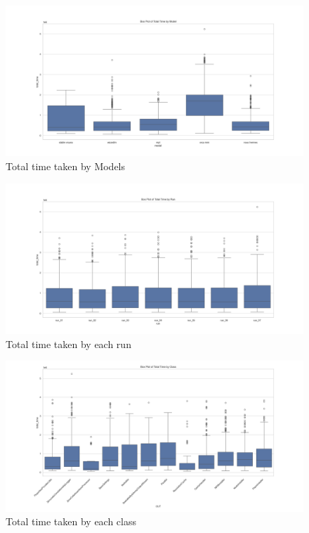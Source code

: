 \begin{figure}[H]
\centering
\includegraphics[width=1\textwidth]{images/time_by_model.png}
\caption{Total time taken by Models}
\label{fig:time_models}
\end{figure}

\begin{figure}[H]
\centering
\includegraphics[width=1\textwidth]{images/time_by_runs.png}
\caption{Total time taken by each run}
\label{fig:time_runs}
\end{figure}

\begin{figure}[H]
\centering
\includegraphics[width=1\textwidth]{images/total_time_by_class.png}
\caption{Total time taken by each class}
\label{fig:time_class}
\end{figure}

